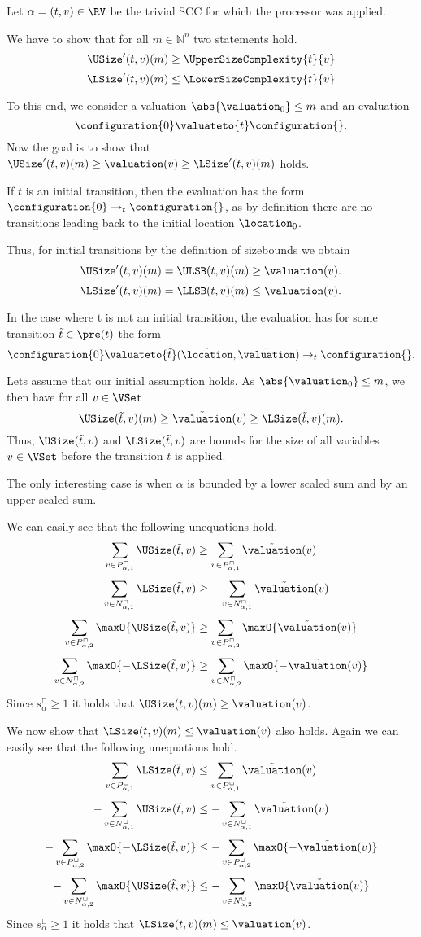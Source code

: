 Let $\alpha = (t, v) \in \RV$ be the trivial SCC for which the processor was applied.

We have to show that for all $m \in \mathbb{N}^n$ two statements hold.
\[ \USize'(t, v)(m) \geq \UpperSizeComplexity{t}{v} \]
\[ \LSize'(t, v)(m) \leq \LowerSizeComplexity{t}{v} \]

To this end, we consider a valuation $\abs{\valuation_0} \leq m$ and an evaluation
\[ \configuration{0} \valuateto{t} \configuration{} . \]
Now the goal is to show that $\USize'(t, v)(m) \geq \valuation(v) \geq \LSize'(t, v)(m)$ holds.

If $t$ is an initial transition, then the evaluation has the form $\configuration{0} \rightarrow_t \configuration{}$, as by definition there are no transitions leading back to the initial location $\location_0$.

Thus, for initial transitions by the definition of sizebounds we obtain
\[ \USize'(t, v)(m) = \ULSB(t, v)(m) \geq \valuation(v). \]
\[ \LSize'(t, v)(m) = \LLSB(t, v)(m) \leq \valuation(v). \]

In the case where t is not an initial transition, the evaluation has for some transition $\tilde{t} \in \pre(t)$ the form
\[ \configuration{0}  \valuateto{\tilde{t}} (\tilde{\location}, \tilde{\valuation}) \rightarrow_t \configuration{}. \]

Lets assume that our initial assumption holds.
As $\abs{\valuation_0} \leq m$, we then have for all $v \in \VSet$
\[ \USize(\tilde{t}, v)(m) \geq \tilde{\valuation}(v) \geq \LSize(\tilde{t}, v)(m). \]
Thus, $\USize(\tilde{t}, v)$ and $\LSize(\tilde{t}, v)$ are bounds for the size of all variables $v \in \VSet$ before the transition $t$ is applied.

The only interesting case is when $\alpha$ is bounded by a lower scaled sum and by an upper scaled sum.

We can easily see that the following unequations hold.
\[ \sum_{v \in P_{\alpha,1}^\sqcap} \USize(\tilde{t}, v) \geq \sum_{v \in P_{\alpha,1}^\sqcap} \tilde{\valuation}(v) \]
\[ - \sum_{v \in N_{\alpha,1}^\sqcap} \LSize(\tilde{t}, v) \geq - \sum_{v \in N_{\alpha,1}^\sqcap} \tilde{\valuation}(v) \]
\[ \sum_{v \in P_{\alpha,2}^\sqcap} \maxO{\USize(\tilde{t}, v)} \geq \sum_{v \in P_{\alpha,2}^\sqcap} \maxO{\tilde{\valuation}(v)} \]
\[ \sum_{v \in N_{\alpha,2}^\sqcap} \maxO{-\LSize(\tilde{t}, v)} \geq \sum_{v \in N_{\alpha,2}^\sqcap} \maxO{-\tilde{\valuation}(v)} \]
Since $s^\sqcap_\alpha \geq 1$ it holds that $\USize(t, v)(m) \geq \valuation(v)$.

We now show that $\LSize(t, v)(m) \leq \valuation(v)$ also holds.
Again we can easily see that the following unequations hold.
\[ \sum_{v \in P_{\alpha,1}^\sqcup} \LSize(\tilde{t}, v) \leq \sum_{v \in P_{\alpha,1}^\sqcup} \tilde{\valuation}(v) \]
\[ - \sum_{v \in N_{\alpha,1}^\sqcup} \USize(\tilde{t}, v) \leq - \sum_{v \in N_{\alpha,1}^\sqcup} \tilde{\valuation}(v) \]
\[ - \sum_{v \in P_{\alpha,2}^\sqcup} \maxO{-\LSize(\tilde{t}, v)} \leq - \sum_{v \in P_{\alpha,2}^\sqcup} \maxO{-\tilde{\valuation}(v)} \]
\[ - \sum_{v \in N_{\alpha,2}^\sqcup} \maxO{\USize(\tilde{t}, v)} \leq - \sum_{v \in N_{\alpha,2}^\sqcup} \maxO{\tilde{\valuation}(v)} \]
Since $s^\sqcup_\alpha \geq 1$ it holds that $\LSize(t, v)(m) \leq \valuation(v)$.
